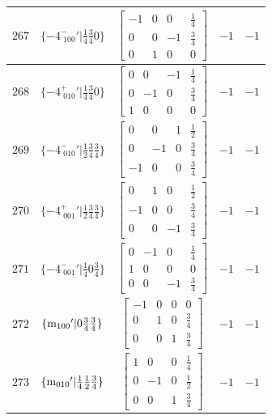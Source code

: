 \documentclass[fleqn,8pt]{jsarticle}
\begin{document}
\begin{longtable}{ccccc}
$ 267 $ & $ \{-4^{-}_{\,\,100}{}'|\frac{1}{4} \frac{3}{4} 0\} $ & $ \begin{bmatrix} -1 & 0 & 0 & \frac{1}{4} \\ 0 & 0 & -1 & \frac{3}{4} \\ 0 & 1 & 0 & 0 \end{bmatrix} $ & $ -1 $ & $ -1 $ \\ \hline
$ 268 $ & $ \{-4^{+}_{\,\,010}{}'|\frac{1}{4} \frac{3}{4} 0\} $ & $ \begin{bmatrix} 0 & 0 & -1 & \frac{1}{4} \\ 0 & -1 & 0 & \frac{3}{4} \\ 1 & 0 & 0 & 0 \end{bmatrix} $ & $ -1 $ & $ -1 $ \\ \hline
$ 269 $ & $ \{-4^{-}_{\,\,010}{}'|\frac{1}{2} \frac{3}{4} \frac{3}{4}\} $ & $ \begin{bmatrix} 0 & 0 & 1 & \frac{1}{2} \\ 0 & -1 & 0 & \frac{3}{4} \\ -1 & 0 & 0 & \frac{3}{4} \end{bmatrix} $ & $ -1 $ & $ -1 $ \\ \hline
$ 270 $ & $ \{-4^{+}_{\,\,001}{}'|\frac{1}{2} \frac{3}{4} \frac{3}{4}\} $ & $ \begin{bmatrix} 0 & 1 & 0 & \frac{1}{2} \\ -1 & 0 & 0 & \frac{3}{4} \\ 0 & 0 & -1 & \frac{3}{4} \end{bmatrix} $ & $ -1 $ & $ -1 $ \\ \hline
$ 271 $ & $ \{-4^{-}_{\,\,001}{}'|\frac{1}{4} 0 \frac{3}{4}\} $ & $ \begin{bmatrix} 0 & -1 & 0 & \frac{1}{4} \\ 1 & 0 & 0 & 0 \\ 0 & 0 & -1 & \frac{3}{4} \end{bmatrix} $ & $ -1 $ & $ -1 $ \\ \hline
$ 272 $ & $ \{{\rm m}_{100}{}'|0 \frac{3}{4} \frac{3}{4}\} $ & $ \begin{bmatrix} -1 & 0 & 0 & 0 \\ 0 & 1 & 0 & \frac{3}{4} \\ 0 & 0 & 1 & \frac{3}{4} \end{bmatrix} $ & $ -1 $ & $ -1 $ \\ \hline
$ 273 $ & $ \{{\rm m}_{010}{}'|\frac{1}{4} \frac{1}{2} \frac{3}{4}\} $ & $ \begin{bmatrix} 1 & 0 & 0 & \frac{1}{4} \\ 0 & -1 & 0 & \frac{1}{2} \\ 0 & 0 & 1 & \frac{3}{4} \end{bmatrix} $ & $ -1 $ & $ -1 $ \\ \hline

\end{longtable}
\end{document}
